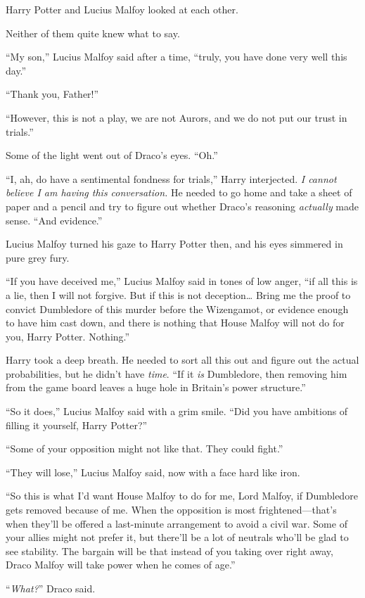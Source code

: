 Harry Potter and Lucius Malfoy looked at each other.

Neither of them quite knew what to say.

“My son,” Lucius Malfoy said after a time, “truly, you have done very well this day.”

“Thank you, Father!”

“However, this is not a play, we are not Aurors, and we do not put our trust in trials.”

Some of the light went out of Draco’s eyes. “Oh.”

“I, ah, do have a sentimental fondness for trials,” Harry interjected. \emph{I cannot believe I am having this conversation.} He needed to go home and take a sheet of paper and a pencil and try to figure out whether Draco’s reasoning \emph{actually} made sense. “And evidence.”

Lucius Malfoy turned his gaze to Harry Potter then, and his eyes simmered in pure grey fury.

“If you have deceived me,” Lucius Malfoy said in tones of low anger, “if all this is a lie, then I will not forgive. But if this is not deception… Bring me the proof to convict Dumbledore of this murder before the Wizengamot, or evidence enough to have him cast down, and there is nothing that House Malfoy will not do for you, Harry Potter. Nothing.”

Harry took a deep breath. He needed to sort all this out and figure out the actual probabilities, but he didn’t have \emph{time}. “If it \emph{is} Dumbledore, then removing him from the game board leaves a huge hole in Britain’s power structure.”

“So it does,” Lucius Malfoy said with a grim smile. “Did you have ambitions of filling it yourself, Harry Potter?”

“Some of your opposition might not like that. They could fight.”

“They will lose,” Lucius Malfoy said, now with a face hard like iron.

“So this is what I’d want House Malfoy to do for me, Lord Malfoy, if Dumbledore gets removed because of me. When the opposition is most frightened—that’s when they’ll be offered a last-minute arrangement to avoid a civil war. Some of your allies might not prefer it, but there’ll be a lot of neutrals who’ll be glad to see stability. The bargain will be that instead of you taking over right away, Draco Malfoy will take power when he comes of age.”

“\emph{What?}” Draco said.

